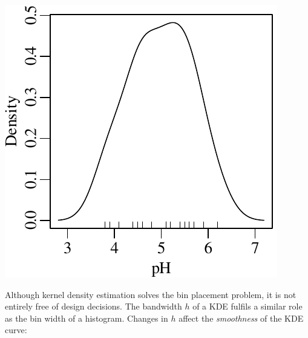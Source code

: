 \noindent\begin{minipage}[t][][b]{.3\textwidth}
  \includegraphics[width=\textwidth]{../figures/pHgaussKDE.pdf}\\
\end{minipage}
\begin{minipage}[t][][t]{.7\textwidth}
  \label{fig:pHgaussKDE}
\end{minipage}

Although kernel density estimation solves the bin placement problem,
it is not entirely free of design decisions. The bandwidth $h$ of a
KDE fulfils a similar role as the bin width of a histogram. Changes in
$h$ affect the \emph{smoothness} of the KDE curve:\\

